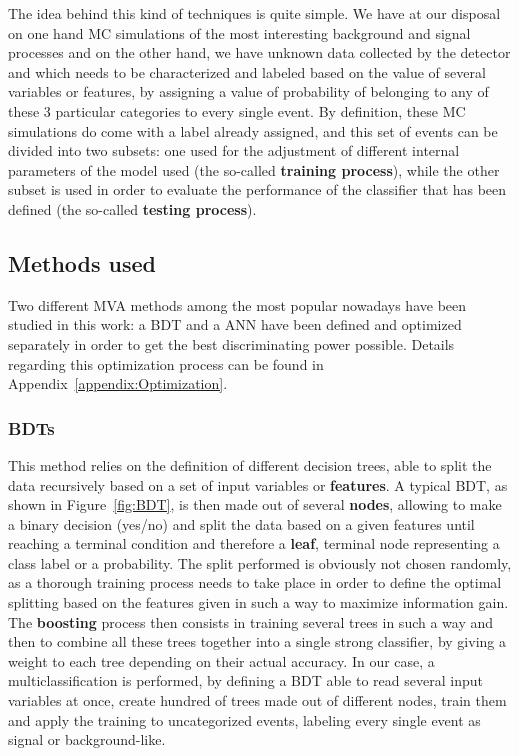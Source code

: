 \documentclass[a4paper, 10pt, openright]{report}
\begin{document}
The idea behind this kind of techniques is quite simple. We have at our disposal on one hand \ac{MC} simulations of the most interesting background and signal processes and on the other hand, we have unknown data collected by the detector and which needs to be characterized and labeled based on the value of several variables or features, by assigning a value of probability of belonging to any of these 3 particular categories to every single event. By definition, these \ac{MC} simulations do come with a label already assigned, and this set of events can be divided into two subsets: one used for the adjustment of different internal parameters of the model used (the so-called \textbf{training process}), while the other subset is used in order to evaluate the performance of the classifier that has been defined (the so-called \textbf{testing process}).

\subsection{Methods used}

Two different \ac{MVA} methods among the most popular nowadays have been studied in this work: a \acf{BDT} and a \acf{ANN} have been defined and optimized separately in order to get the best discriminating power possible. Details regarding this optimization process can be found in Appendix~\ref{appendix:Optimization}.

\subsubsection{\acfp{BDT}}\label{section:BDT}

This method relies on the definition of different decision trees, able to split the data recursively based on a set of input variables or \textbf{features}. A typical \ac{BDT}, as shown in Figure~\ref{fig:BDT}, is then made out of several \textbf{nodes}, allowing to make a binary decision (yes/no) and split the data based on a given features until reaching a terminal condition and therefore a \textbf{leaf}, terminal node representing a class label or a probability. The split performed is obviously not chosen randomly, as a thorough training process needs to take place in order to define the optimal splitting based on the features given in such a way to maximize information gain. The \textbf{boosting} process then consists in training several trees in such a way and then to combine all these trees together into a single strong classifier, by giving a weight to each tree depending on their actual accuracy. In our case, a multiclassification is performed, by defining a \ac{BDT} able to read several input variables at once, create hundred of trees made out of different nodes, train them and apply the training to uncategorized events, labeling every single event as signal or background-like.
\end{document}

